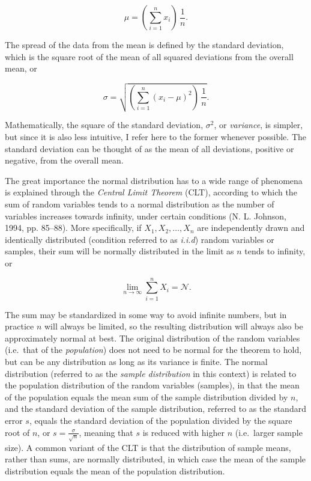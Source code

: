 \documentclass[
  12pt,
]{book}
\begin{document}
\begin{equation}
\mu = (\sum_{i=1}^nx_i)\,\frac{1}{n}.
\label{eq:mu}
\end{equation}

The spread of the data from the mean is defined by the standard deviation, which is the square root of the mean of all squared deviations from the overall mean, or

\begin{equation}
\sigma = \sqrt{(\sum_{i=1}^n(x_i-\mu)^2)\,\frac{1}{n}}.
\label{eq:sigma}
\end{equation}

Mathematically, the square of the standard deviation, \(\sigma^2\), or \emph{variance}, is simpler, but since it is also less intuitive, I refer here to the former whenever possible. The standard deviation can be thought of as the mean of all deviations, positive or negative, from the overall mean.

The great importance the normal distribution has to a wide range of phenomena is explained through the \emph{Central Limit Theorem} (CLT), according to which the sum of random variables tends to a normal distribution as the number of variables increases towards infinity, under certain conditions (N. L. Johnson, 1994, pp. 85--88). More specifically, if \(X_1, X_2, \dots, X_n\) are independently drawn and identically distributed (condition referred to as \emph{i.i.d}) random variables or samples, their sum will be normally distributed in the limit as \(n\) tends to infinity, or

\begin{equation}
\lim\limits_{n \to \infty} \sum_{i=1}^n X_i = \mathcal{N}.
\label{eq:CLT}
\end{equation}

The sum may be standardized in some way to avoid infinite numbers, but in practice \(n\) will always be limited, so the resulting distribution will always also be approximately normal at best. The original distribution of the random variables (i.e.~that of the \emph{population}) does not need to be normal for the theorem to hold, but can be any distribution as long as its variance is finite. The normal distribution (referred to as the \emph{sample distribution} in this context) is related to the population distribution of the random variables (samples), in that the mean of the population equals the mean sum of the sample distribution divided by \(n\), and the standard deviation of the sample distribution, referred to as the standard error \(s\), equals the standard deviation of the population divided by the square root of \(n\), or \(s = \frac{\sigma}{\sqrt{n}}\), meaning that \(s\) is reduced with higher \(n\) (i.e.~larger sample size). A common variant of the CLT is that the distribution of sample means, rather than sums, are normally distributed, in which case the mean of the sample distribution equals the mean of the population distribution.
\end{document}
